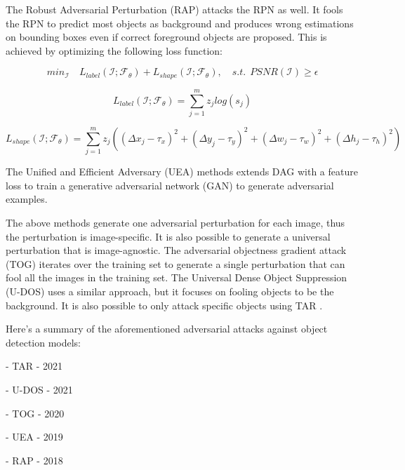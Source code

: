 The Robust Adversarial Perturbation (RAP) \cite{li2018robust} attacks the RPN as well. It fools the RPN to predict most objects as background and produces wrong estimations on bounding boxes even if correct foreground objects are proposed. This is achieved by optimizing the following loss function:

\begin{equation} 
min_\mathcal{I} \quad L_{label}(\mathcal{I};\mathcal{F}_{\theta}) + L_{shape}(\mathcal{I};\mathcal{F}_{\theta}), \quad s.t. \ \ PSNR(\mathcal{I}) \geq \epsilon
\end{equation}

\begin{equation}
    L_{label}(\mathcal{I};\mathcal{F}_{\theta}) = \sum_{j=1}^{m} z_j log(s_j)
\end{equation}

\begin{equation}
    L_{shape}(\mathcal{I};\mathcal{F}_{\theta}) = \sum_{j=1}^{m} z_j((\Delta x_j - \tau_x)^2 + (\Delta y_j - \tau_y)^2 + (\Delta w_j - \tau_w)^2 + (\Delta h_j - \tau_h)^2)
\end{equation}

The Unified and Efficient Adversary (UEA) \cite{ijcai2019-134} methods extends DAG with a feature loss to train a generative adversarial network (GAN) to generate adversarial examples. 

The above methods generate one adversarial perturbation for each image, thus the perturbation is image-specific. It is also possible to generate a universal perturbation that is image-agnostic. The adversarial objectness gradient attack (TOG)\cite{chow2020adversarial} iterates over the training set to generate a single perturbation that can fool all the images in the training set. The Universal Dense Object Suppression (U-DOS) \cite{LI2021107584} uses a similar approach, but it focuses on fooling objects to be the background. It is also possible to only attack specific objects using TAR \cite{mohamad2021}.

Here's a summary of the aforementioned adversarial attacks against object detection models:

- TAR \cite{mohamad2021} - 2021

- U-DOS \cite{LI2021107584} - 2021

- TOG \cite{chow2020adversarial} - 2020

- UEA \cite{ijcai2019-134} - 2019

- RAP \cite{li2018robust} - 2018

